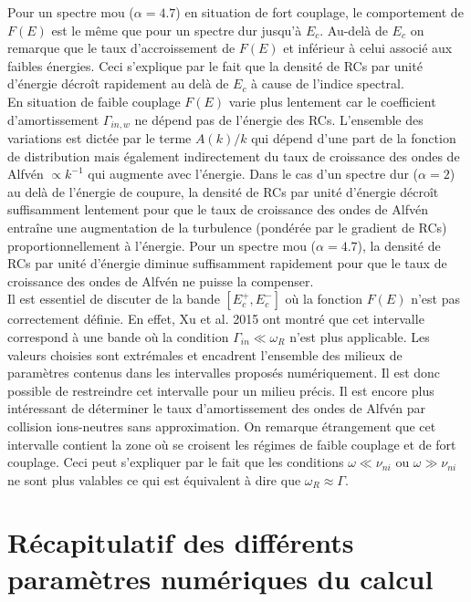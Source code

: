 \documentclass[10pt,a4paper]{article}
\begin{document}
Pour un spectre mou ($\alpha = 4.7$) en situation de fort couplage, le comportement de $F(E)$ est le même que pour un spectre dur jusqu'à $E_c$. Au-delà de $E_c$ on remarque que le taux d'accroissement de $F(E)$ et inférieur à celui associé aux faibles énergies. Ceci s'explique par le fait que la densité de RCs par unité d'énergie décroît rapidement au delà de $E_c$ à cause de l'indice spectral. \\ 

En situation de faible couplage $F(E)$ varie plus lentement car le coefficient d'amortissement $\Gamma_{in,w}$ ne dépend pas de l'énergie des RCs. L'ensemble des variations est dictée par le terme $A(k)/k$ qui dépend d'une part de la fonction de distribution mais également indirectement du taux de croissance des ondes de Alfvén $\propto k^{-1}$ qui augmente avec l'énergie. Dans le cas d'un spectre dur ($\alpha = 2$) au delà de l'énergie de coupure, la densité de RCs par unité d'énergie décroît suffisamment lentement pour que le taux de croissance des ondes de Alfvén entraîne une augmentation de la turbulence (pondérée par le gradient de RCs) proportionnellement à l'énergie. Pour un spectre mou ($\alpha = 4.7$), la densité de RCs par unité d'énergie diminue suffisamment rapidement pour que le taux de croissance des ondes de Alfvén ne puisse la compenser. \\ 

Il est essentiel de discuter de la bande $[E^+_{c}, E^-_{c}]$  où la fonction $F(E)$ n'est pas correctement définie. En effet, Xu et al. 2015 ont montré que cet intervalle correspond à une bande où la condition $\Gamma_{in} \ll \omega_R$ n'est plus applicable. Les valeurs choisies sont extrémales et encadrent l'ensemble des milieux de paramètres contenus dans les intervalles proposés numériquement. Il est donc possible de restreindre cet intervalle pour un milieu précis. Il est encore plus intéressant de déterminer le taux d'amortissement des ondes de Alfvén par collision ions-neutres sans approximation. On remarque étrangement que cet intervalle contient la zone où se croisent les régimes de faible couplage et de fort couplage. Ceci peut s'expliquer par le fait que les conditions $\omega \ll \nu_{ni}$ ou $\omega \gg \nu_{ni}$ ne sont plus valables ce qui est équivalent à dire que $\omega_R \approx \Gamma$.  



\appendix

\section{Récapitulatif des différents paramètres numériques du calcul}
\end{document}
